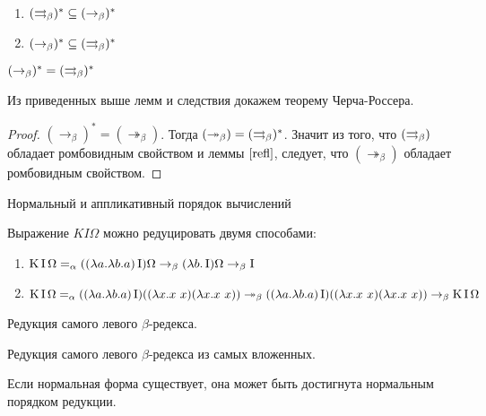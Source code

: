 \documentclass[aspectratio=169]{beamer}
\begin{document}
\begin{frame}{}
\begin{lmm}
	\
	\begin{enumerate}
		\item $(\rightrightarrows_{\beta} )^{*} \subseteq (\to_{\beta})^{*}$
		\item $(\to_{\beta})^{*} \subseteq (\rightrightarrows_{\beta} )^{*}$
	\end{enumerate}
\end{lmm}

\begin{cons}
	$(\to_{\beta})^{*}=(\rightrightarrows_{\beta} )^{*}$
\end{cons}

Из приведенных выше лемм и следствия докажем теорему Черча-Россера.

\begin{proof}
	$(\to_{\beta})^{*} = (\twoheadrightarrow_{\beta})$. Тогда $(\twoheadrightarrow_{\beta})=(\rightrightarrows_{\beta} )^{*}$. Значит из того, что $(\rightrightarrows_{\beta} )$ обладает ромбовидным свойством и леммы $\ref{refl}$, следует, что $(\twoheadrightarrow_{\beta})$ обладает ромбовидным свойством.
\end{proof}
\end{frame}

\begin{frame}{Нормальный и аппликативный порядок вычислений}

\begin{exm}
	Выражение $KI\Omega$ можно редуцировать двумя способами:
	\begin{enumerate}
		\item $\operatorname{\bf{\textrm{K}}} \operatorname{\bf{\textrm{I}}} \Omega =_{\alpha} ((\lambda{}a.\lambda{}b.a) \operatorname{\bf{\textrm{I}}}) \Omega \to_{\beta} (\lambda{}b.\operatorname{\bf{\textrm{I}}})\Omega  \to_{\beta} \operatorname{\bf{\textrm{I}}}$
		\item  $\comb K \comb I \Omega =_{\alpha} ((\lambda{}a.\lambda{}b.a) \comb I)((\lambda{}x.x \ x) (\lambda{}x.x \ x)) \twoheadrightarrow_{\beta} ((\lambda{}a.\lambda{}b.a) \comb I)((\lambda{}x.x \ x) (\lambda{}x.x \ x)) \to_{\beta} \comb K \comb I \Omega $
	\end{enumerate}
\end{exm}


\begin{dfn}
	Редукция самого левого $\beta$-редекса.
\end{dfn}

\begin{dfn}
	Редукция самого левого $\beta$-редекса из самых вложенных.
\end{dfn}

\begin{thm}
	Если нормальная форма существует, она может быть достигнута нормальным порядком редукции.
\end{thm}
\end{frame}
\end{document}
